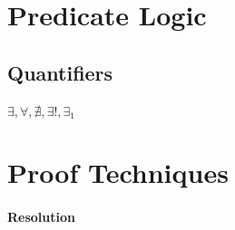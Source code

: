 





\section{Predicate Logic}



\subsection{Quantifiers}

$\exists, \forall, \nexists, \exists!, \exists_1$




\section{Proof Techniques}







\paragraph{Resolution}

